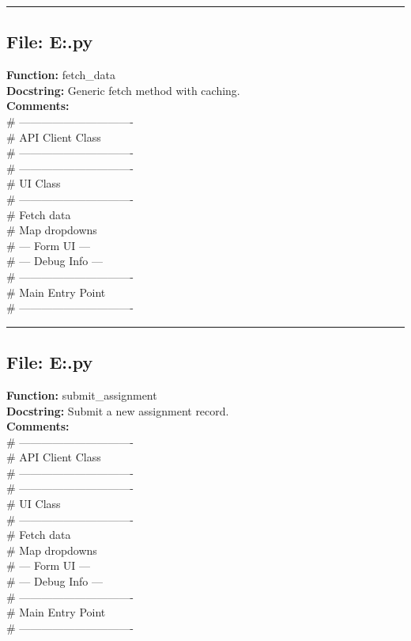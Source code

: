 {\hrule

\subsection*{File: E:\project\capstone\frontend\faculty\assignment.py}
\textbf{Function:} fetch_data\\
\textbf{Docstring:} Generic fetch method with caching.\\
\textbf{Comments:}\\
# -------------------------------\\
# API Client Class\\
# -------------------------------\\
# -------------------------------\\
# UI Class\\
# -------------------------------\\
# Fetch data\\
# Map dropdowns\\
# --- Form UI ---\\
# --- Debug Info ---\\
# -------------------------------\\
# Main Entry Point\\
# -------------------------------\\

\hrule

\subsection*{File: E:\project\capstone\frontend\faculty\assignment.py}
\textbf{Function:} submit_assignment\\
\textbf{Docstring:} Submit a new assignment record.\\
\textbf{Comments:}\\
# -------------------------------\\
# API Client Class\\
# -------------------------------\\
# -------------------------------\\
# UI Class\\
# -------------------------------\\
# Fetch data\\
# Map dropdowns\\
# --- Form UI ---\\
# --- Debug Info ---\\
# -------------------------------\\
# Main Entry Point\\
# -------------------------------\\

}
